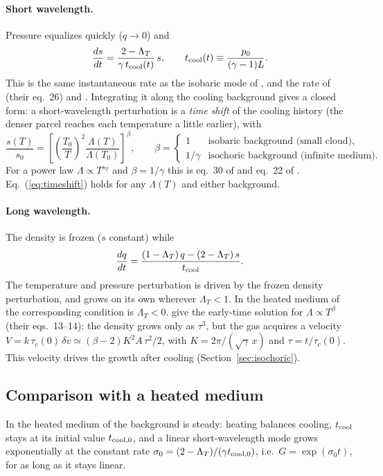 \documentclass[11pt]{article}
\newcommand{\tcool}{t_{\rm cool}}
\newcommand{\LT}{\Lambda_T}
\begin{document}
\paragraph{Short wavelength.} Pressure equalizes quickly ($q\to0$) and
\begin{equation}
\frac{ds}{dt}=\frac{2-\LT}{\gamma\,\tcool(t)}\,s,\qquad
\tcool(t)\equiv\frac{p_0}{(\gamma-1)L}.
\label{eq:isobaric}
\end{equation}
This is the same instantaneous rate as the isobaric mode of \citet{das21}, and
the rate of \citet{schwarz72} (their eq.~26) and \citet[their eq.~A6]{mathews78}.
Integrating it along the cooling background gives a closed form: a short-wavelength
perturbation is a \emph{time shift} of the cooling history (the denser parcel
reaches each temperature a little earlier), with
\begin{equation}
\frac{s(T)}{s_0}=\left[\left(\frac{T_0}{T}\right)^2\frac{\Lambda(T)}{\Lambda(T_0)}\right]^{\beta},
\qquad \beta=\begin{cases}1 & \text{isobaric background (small cloud)},\\
1/\gamma & \text{isochoric background (infinite medium)}.\end{cases}
\label{eq:timeshift}
\end{equation}
For a power law $\Lambda\propto T^{s_T}$ and $\beta=1/\gamma$ this is eq.~30 of
\citet{schwarz72} and eq.~22 of \citet{burkert00}. Eq.~(\ref{eq:timeshift}) holds for
any $\Lambda(T)$ and either background.

\paragraph{Long wavelength.} The density is frozen ($s$ constant) while
\begin{equation}
\frac{dq}{dt}=\frac{(1-\LT)\,q-(2-\LT)\,s}{\tcool}.
\label{eq:isochoric}
\end{equation}
The temperature and pressure perturbation is driven by the frozen density
perturbation, and grows on its own wherever $\LT<1$. In the heated medium of
\citet{das21} the corresponding condition is $\LT<0$. \citet{burkert00} give the
early-time solution for $\Lambda\propto T^\beta$ (their eqs.~13--14): the density
grows only as $\tau^3$, but the gas acquires a velocity
$V=k\,\tau_c(0)\,\delta v\simeq(\beta-2)K^2A\,\tau^2/2$, with $K=2\pi/(\sqrt\gamma\,x)$
and $\tau=t/\tau_c(0)$. This velocity drives the growth after cooling
(Section~\ref{sec:isochoric}).

\subsection{Comparison with a heated medium}
\label{sec:whyheated}
In the heated medium of \citet{das21} the background is steady: heating balances
cooling, $\tcool$ stays at its initial value $t_{\rm cool,0}$, and a linear
short-wavelength mode grows exponentially at the constant rate
$\sigma_0=(2-\LT)/(\gamma t_{\rm cool,0})$, i.e.\ $G=\exp(\sigma_0 t)$, for as long
as it stays linear.
\end{document}
